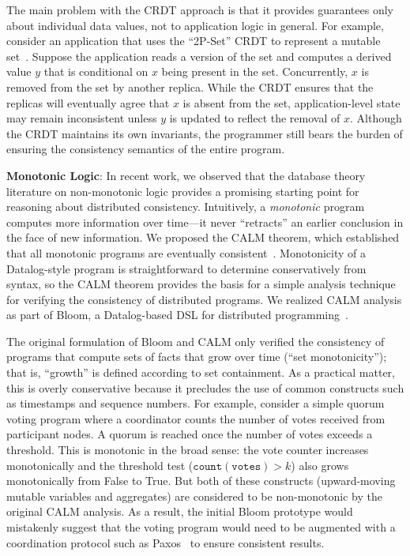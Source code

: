 The main problem with the CRDT approach is that it provides guarantees only
about individual data values, not to application logic in general. For example,
consider an application that uses the ``2P-Set'' CRDT to represent a mutable
set~\cite{Shapiro2011a}. Suppose the application reads a version of the set and
computes a derived value $y$ that is conditional on $x$ being present in the
set. Concurrently, $x$ is removed from the set by another replica. While the
CRDT ensures that the replicas will eventually agree that $x$ is absent from the
set, application-level state may remain inconsistent unless $y$ is updated to
reflect the removal of $x$. Although the CRDT maintains its own invariants, the
programmer still bears the burden of ensuring the consistency semantics of the
entire program.

\vspace{0.5em} \noindent

\textbf{Monotonic Logic}: In recent work, we observed that the database theory
literature on non-monotonic logic provides a promising starting point for
reasoning about distributed consistency. Intuitively, a \emph{monotonic} program
computes more information over time---it never ``retracts'' an earlier
conclusion in the face of new information. We proposed the CALM
theorem, which established that all monotonic programs
are eventually consistent~\cite{Ameloot2011,Hellerstein2010,dedalus-pods12-tr}. Monotonicity of
a Datalog-style program is straightforward to determine conservatively from
syntax, so the CALM theorem provides the basis for a simple analysis technique
for verifying the consistency of distributed programs. We
realized CALM analysis as part of Bloom, a Datalog-based DSL for distributed
programming~\cite{Alvaro2011,bloom}.

The original formulation of Bloom and CALM only verified the consistency of
programs that compute sets of facts that grow over time (``set monotonicity'');
that is, ``growth'' is defined according to set containment. As a practical
matter, this is overly conservative because it precludes the use of common
constructs such as timestamps and sequence numbers. For example, consider a
simple quorum voting program where a coordinator counts the number of votes
received from participant nodes. A quorum is reached once the number of votes
exceeds a threshold. This is monotonic in the broad sense: the vote counter
increases monotonically and the threshold test ($\mathtt{count(votes)} > k$)
also grows monotonically from False to True. But both of these constructs
(upward-moving mutable variables and aggregates) are considered to be
non-monotonic by the original CALM analysis.  As a result, the initial Bloom
prototype would mistakenly suggest that the voting program would need to be
augmented with a coordination protocol such as Paxos~\cite{Lamport1998} to
ensure consistent results.


